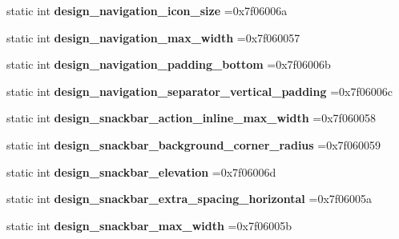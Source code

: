 \begin{DoxyCompactItemize}
static int {\bfseries design\+\_\+navigation\+\_\+icon\+\_\+size} =0x7f06006a
\item 
\mbox{\label{classandroid_1_1support_1_1v4_1_1R_1_1dimen_aedad08bc1b165a23a08e5ef7cd05df30}} 
static int {\bfseries design\+\_\+navigation\+\_\+max\+\_\+width} =0x7f060057
\item 
\mbox{\label{classandroid_1_1support_1_1v4_1_1R_1_1dimen_aa2f0e8c8b2d4f768645397581759c66e}} 
static int {\bfseries design\+\_\+navigation\+\_\+padding\+\_\+bottom} =0x7f06006b
\item 
\mbox{\label{classandroid_1_1support_1_1v4_1_1R_1_1dimen_a4be059d15eb2e5b7f5247237cc79c47f}} 
static int {\bfseries design\+\_\+navigation\+\_\+separator\+\_\+vertical\+\_\+padding} =0x7f06006c
\item 
\mbox{\label{classandroid_1_1support_1_1v4_1_1R_1_1dimen_ae6180912875adf140656aa9f402373f7}} 
static int {\bfseries design\+\_\+snackbar\+\_\+action\+\_\+inline\+\_\+max\+\_\+width} =0x7f060058
\item 
\mbox{\label{classandroid_1_1support_1_1v4_1_1R_1_1dimen_a3632e0a6c49d704a46a229045cbe788e}} 
static int {\bfseries design\+\_\+snackbar\+\_\+background\+\_\+corner\+\_\+radius} =0x7f060059
\item 
\mbox{\label{classandroid_1_1support_1_1v4_1_1R_1_1dimen_a6798341be3cf77127c3a7146ae1e72ea}} 
static int {\bfseries design\+\_\+snackbar\+\_\+elevation} =0x7f06006d
\item 
\mbox{\label{classandroid_1_1support_1_1v4_1_1R_1_1dimen_ac73a9b2c114acca50638097790af6879}} 
static int {\bfseries design\+\_\+snackbar\+\_\+extra\+\_\+spacing\+\_\+horizontal} =0x7f06005a
\item 
\mbox{\label{classandroid_1_1support_1_1v4_1_1R_1_1dimen_addb1b6fa5be8178eb7368832af4a4265}} 
static int {\bfseries design\+\_\+snackbar\+\_\+max\+\_\+width} =0x7f06005b

\end{DoxyCompactItemize}
